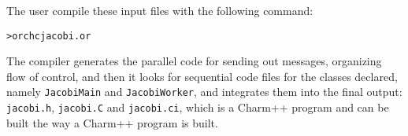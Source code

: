 The user compile these input files with the following command:

\begin{alltt}
> orchc jacobi.or
\end{alltt}

The compiler generates the parallel code for sending out messages, organizing
flow of control, and then it looks for sequential code files for the classes
declared, namely {\tt JacobiMain} and {\tt JacobiWorker}, and integrates them
into the final output: {\tt jacobi.h}, {\tt jacobi.C} and {\tt jacobi.ci}, which
is a Charm++ program and can be built the way a Charm++ program is built.

